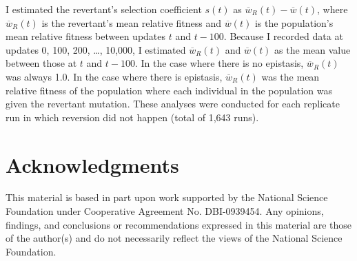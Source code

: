 \begin{doublespace}
I estimated the revertant's selection coefficient $s(t)$
as $\overline{w}_{R}(t) - \overline{w}(t)$,
where $\overline{w}_{R}(t)$ is the revertant's mean relative fitness
and $\overline{w}(t)$ is the population's mean relative fitness
between updates $t$ and $t - 100$.
%
Because I recorded data at updates 0, 100, 200, \ldots, 10,000,
I estimated $\overline{w}_{R}(t)$ and $\overline{w}(t)$
as the mean value between those at $t$ and $t - 100$.
%
In the case where there is no epistasis, $\overline{w}_{R}(t)$ was always 1.0.
%
In the case where there is epistasis,
$\overline{w}_{R}(t)$ was the mean relative fitness of the population
where each individual in the population was given the revertant mutation.
%
These analyses were conducted for each replicate run
in which reversion did not happen (total of 1,643 runs).



\section{Acknowledgments}

This material is based in part upon work supported by
the National Science Foundation under Cooperative Agreement No. DBI-0939454.
%
Any opinions, findings, and conclusions or recommendations
expressed in this material are those of the author(s)
and do not necessarily reflect the views of the National Science Foundation.



\end{doublespace}




